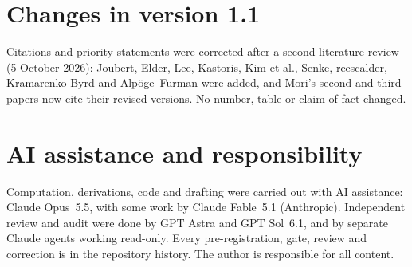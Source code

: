 \documentclass[11pt]{article}
\theoremstyle{remark}
\begin{document}
\section*{Changes in version 1.1}
Citations and priority statements were corrected after a second literature review (5 October 2026): Joubert, Elder, Lee, Kastoris, Kim et al., Senke, reescalder, Kramarenko-Byrd and Alpöge--Furman were added, and Mori's second and third papers now cite their revised versions. No number, table or claim of fact changed.

\section*{AI assistance and responsibility}
Computation, derivations, code and drafting were carried out with AI assistance: Claude Opus~5.5, with some work by Claude Fable~5.1 (Anthropic). Independent review and audit were done by GPT Astra and GPT Sol~6.1, and by separate Claude agents working read-only. Every pre-registration, gate, review and correction is in the repository history. The author is responsible for all content.
\end{document}
